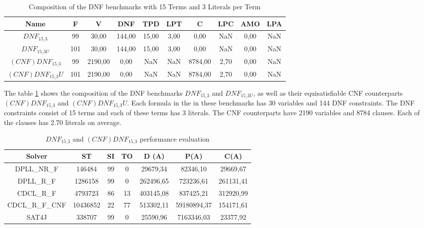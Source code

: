 \begin{table}[!htb]
\centering
\caption{Composition of the DNF benchmarks with 15 Terms and 3 Literals per Term}
\label{tab:dnf153}
\begin{tabular}{|c|c|c|c|c|c|c|c|c|c|}
\hline
Name & F & V & DNF & TPD & LPT & C & LPC & AMO & LPA \\
\hline
$DNF_{15\_3}$ & 99 & 30,00 & 144,00 & 15,00 & 3,00 & 0,00 & NaN & 0,00 & NaN \\ 
 \hline 
$DNF_{15\_3U}$ & 101 & 30,00 & 144,00 & 15,00 & 3,00 & 0,00 & NaN & 0,00 & NaN \\ 
 \hline 
$(CNF)DNF_{15\_3}$ & 99 & 2190,00 & 0,00 & NaN & NaN & 8784,00 & 2,70 & 0,00 & NaN \\ 
 \hline 
$(CNF)DNF_{15\_3}U$ & 101 & 2190,00 & 0,00 & NaN & NaN & 8784,00 & 2,70 & 0,00 & NaN \\ 
 \hline 
\end{tabular}
\end{table}

The table \ref{tab:dnf153} shows the composition of the DNF benchmarks $DNF_{15\_3}$ and $DNF_{15\_3U}$, as well as their equisatisfiable CNF counterparts $(CNF)DNF_{15\_3}$ and $(CNF)DNF_{15\_3}U$. Each formula in the in these benchmarks has 30 variables and 144 DNF constraints. The DNF constraints consist of 15 terms and each of these terms has 3 literals. The CNF counterparts have 2190 variables and 8784 clauses. Each of the clauses has 2.70 literals on average.

\begin{table}[!htb]
\centering
\caption{$DNF_{15\_3}$ and $(CNF)DNF_{15\_3}$ performance evaluation}
\label{tab:dnf153Sat}
\begin{tabular}{|c|c|c|c|c|c|c|}
\hline
Solver & ST & SI & TO & D (A) & P(A) & C(A)\\
\hline
DPLL\_NR\_F & 146484 & 99 & 0 & 29679,34 & 82346,10 & 29669,67 \\
\hline
DPLL\_R\_F & 1286158 & 99 & 0 & 262496,65 & 723236,61 & 261131,41 \\
\hline
CDCL\_R\_F & 4793723 & 86 & 13 & 403145,08 & 837425,21 & 312920,99 \\
\hline
CDCL\_R\_F\_CNF & 10436852 & 22 & 77 & 513302,11 & 59180894,37 & 154171,61 \\
\hline
SAT4J & 338707 & 99 & 0 & 25590,96 & 7163346,03 & 23377,92 \\
\hline
\end{tabular}
\end{table}

